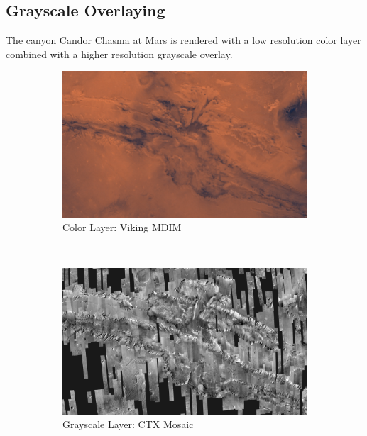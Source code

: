 \clearpage
\subsection{Grayscale Overlaying}
\FloatBarrier
The canyon Candor Chasma at Mars is rendered with a low resolution color layer combined with a higher resolution grayscale overlay.

\begin{figure}[h]
    \centering
    \begin{subfigure}[bt]{0.45\textwidth}
        \includegraphics[width=\textwidth]{figures/results/screenshots_thesis_old/valles_marineris1.jpg}
        \caption{Color Layer: Viking MDIM}
    \end{subfigure}
    ~
    \begin{subfigure}[bt]{0.45\textwidth}
        \includegraphics[width=\textwidth]{figures/results/screenshots_thesis_old/valles_marineris2.jpg}
        \caption{Grayscale Layer: CTX Mosaic}
    \end{subfigure}
    ~
    \begin{subfigure}[bt]{0.90\textwidth}

\end{subfigure}
\end{figure}
